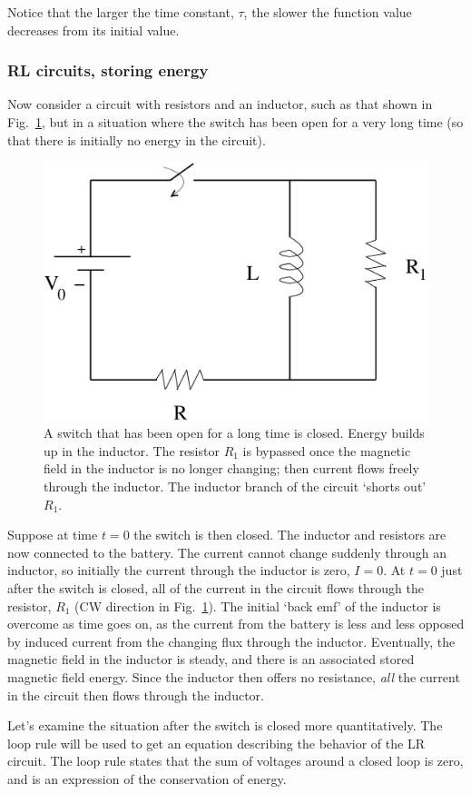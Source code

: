 \documentclass[12pt]{article}
\begin{document}
\begin{flushleft}
Notice that the larger the time constant, $\tau$, the slower the function value decreases from its initial value.


\subsubsection*{RL circuits, storing energy}

Now consider a circuit with resistors and an inductor, such as that shown in Fig.~\ref{fig:rlcircuit2}, but in a situation where the switch has been open for a very long time (so that there is initially no energy in the circuit).   

\begin{figure}[h]
\centering
\includegraphics*[trim=0cm 0cm 0cm 0cm, clip=true, width=0.4\columnwidth]{simplr4.pdf}
\caption{\small A switch that has been open for a long time is closed.  Energy builds up in the inductor.  The resistor $R_{1}$ is bypassed once the magnetic field in the inductor is no longer changing; then current flows freely through the inductor.  The inductor branch of the circuit `shorts out' $R_{1}$.}
\label{fig:rlcircuit2}
\end{figure}

Suppose at time $t=0$ the switch is then closed.  The inductor and resistors are now connected to the battery.  The current cannot change suddenly through an inductor, so initially the current through the inductor is zero, $I=0$.   At $t=0$ just after the switch is closed, all of the current in the circuit flows through the resistor, $R_{1}$ (CW direction in Fig.~\ref{fig:rlcircuit2}).  The initial `back emf' of the inductor is overcome as time goes on, as the current from the battery is less and less opposed by induced current from the changing flux through the inductor.  Eventually, the magnetic field in the inductor is steady, and there is an associated stored magnetic field energy.  Since the inductor then offers no resistance, {\it all} the current in the circuit then flows through the inductor.

Let's examine the situation after the switch is closed more quantitatively.  The loop rule will be used to get an equation describing the behavior of the LR circuit.  The loop rule states that the sum of voltages around a closed loop is zero, and is an expression of the conservation of energy.


\end{flushleft}
\end{document}
